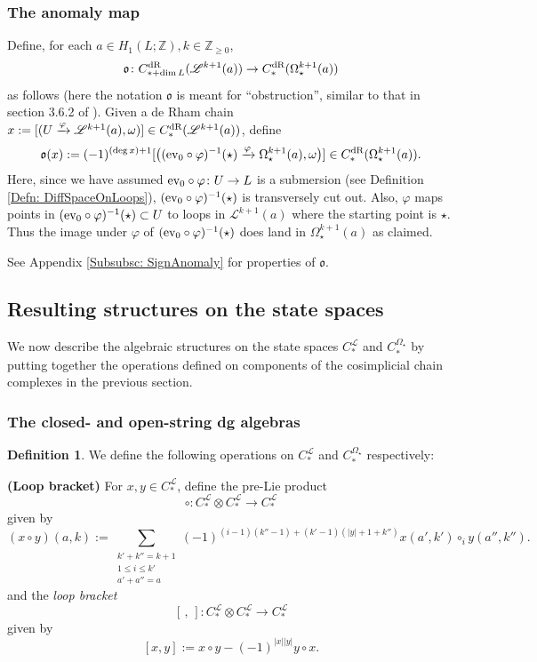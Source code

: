 \documentclass[10pt]{amsart}
\numberwithin{equation}{section}
\theoremstyle{plain}
\theoremstyle{definition}
\newtheorem{definition}[theorem]{Definition}
\theoremstyle{remark}
\numberwithin{equation}{section}
\newcommand{\Z}{\mathbb{Z}}
\newcommand{\ev}{\textup{ev}}
\newcommand{\mf}[1]{\mathfrak{#1}}
\newcommand{\dR}{\textup{dR}}
\newcommand{\CFr}{C_*^\mathscr{L}}
\newcommand{\CBa}{C_*^{\Omega_\star}}
\begin{document}
{\subsubsection{The anomaly map}
Define, for each $a\in H_1(L;\Z), k\in \Z_{\geq 0}$,
\[
	\mathfrak{o}\colon C_{*+\dim L}^\dR(\mathscr{L}^{k+1}(a))\to C_{*}^\dR(\Omega_{\star}^{k+1}(a))
\]as follows (here the notation $\mathfrak{o}$ is meant for ``obstruction'', similar to that in section 3.6.2 of \cite{FOOO1}).
Given a de Rham chain $x:=[(U\xrightarrow{\varphi} \mathscr{L}^{k+1}(a),\omega)]\in C_{*}^\dR(\mathscr{L}^{k+1}(a))$, 
define \begin{align}\label{Eq: AnomalyMap}
	\mathfrak{o}(x):=(-1)^{(\deg x)+1}[\big((\ev_0\circ\varphi)^{-1}(\star)\xrightarrow{\varphi}\Omega_\star^{k+1}(a), \omega\big)] \in C_{*}^\dR(\Omega_\star^{k+1}(a)).
\end{align}
Here, since we have assumed $\ev_0\circ \varphi\colon U\to L$ is a submersion (see Definition \ref{Defn: DiffSpaceOnLoops}), $(\ev_0\circ \varphi)^{-1}(\star)$ is transversely cut out. 
Also, $\varphi$ maps points in $(\ev_0\circ\varphi)^{-1}(\star)\subset U$ to loops in $\mathscr{L}^{k+1} (a)$ where the starting point is $\star$. Thus the image under $\varphi$ of $(\ev_0\circ \varphi)^{-1}(\star)$ does land in $\Omega^{k+1}_\star(a)$ as claimed.

See Appendix \ref{Subsubsc: SignAnomaly} for properties of $\mf{o}$.



\subsection{Resulting structures on the state spaces}\label{Subsc: StringOperState}
We now describe the algebraic structures on the state spaces $C_*^\mathscr{L}$ and $C_*^{\Omega_\star}$ by putting together the operations defined on components of the cosimplicial chain complexes in the previous section.

\subsubsection{The closed- and open-string dg algebras}

\begin{definition}
We define the following operations on $\CFr$ and $\CBa$ respectively:

\textbf{{(Loop bracket)}}
For $x,y\in C_*^\mathscr{L}$, define the pre-Lie product
	\[
		\circ\colon C_*^\mathscr{L}\otimes C_*^\mathscr{L}\to C_*^\mathscr{L}
	\] given by \begin{equation}\label{Eq: LoopPreBracket}
	(x\circ y)(a,k):= \sum_{\substack{k'+k''=k+1\\1\leq i\leq k'\\ a' + a''=a}}(-1)^{(i-1)(k''-1)+(k'-1)(|y|+1+k'')} x(a',k')\circ_i y(a'',k'').
\end{equation}
and the \emph{loop bracket} 
\[
	[\,,\,]\colon C_*^\mathscr{L}\otimes C_*^\mathscr{L}\to \CFr
\]
given by
\begin{equation}\label{Eq: LoopBracket}
	[x,y]:= x\circ y -(-1)^{|x||y|}y\circ x.
\end{equation} 


\end{definition}}
\end{document}
